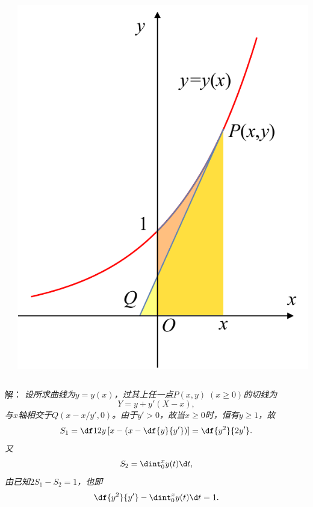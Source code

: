 \begin{frame}
	\linespread{1.5}


	\begin{columns}
		\begin{column}{.55\textwidth}
		\end{column}
		\begin{column}{.4\textwidth}
			\begin{center}
				\includegraphics[width=\textwidth]{./images/ch7/eX.pdf}
			\end{center}
		\end{column}
	\end{columns}
\end{frame}

\begin{frame}
	\linespread{1.5}	
	\small 解：\it
	设所求曲线为$y=y(x)$，过其上任一点$P(x,y)\;(x\geq 0)$的切线为
	$$Y=y+y'(X-x),$$
	与$x$轴相交于$Q(x-x/y',0)$。由于$y'>0$，故当$x\geq 0$时，恒有$y\geq 1$，故
	$$S_1=\df12y\left[x-\left(x-\df{y}{y'}\right)\right]=\df{y^2}{2y'}.$$
	又
	$$S_2=\dint_0^xy(t)\d t,$$
	由已知$2S_1-S_2=1$，也即
	$$\df{y^2}{y'}-\dint_0^xy(t)\d t=1.$$
\end{frame}

